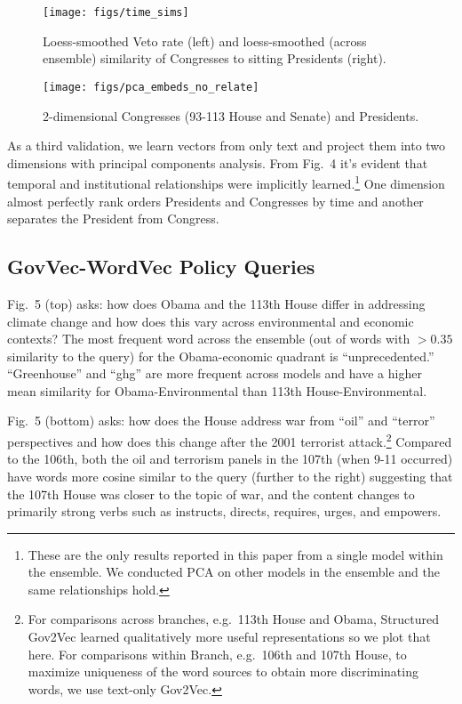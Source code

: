 \documentclass[11pt,letterpaper]{article}
\begin{document}
\begin{figure}[t]

\begin{minipage}{.48\linewidth}
  \texttt{[image: figs/time\_sims]}
  \caption{Loess-smoothed Veto rate (left) and loess-smoothed (across ensemble) similarity of Congresses to sitting Presidents (right).}
  \label{img1}
\end{minipage}
\begin{minipage}{.51\linewidth}
  \texttt{[image: figs/pca\_embeds\_no\_relate]}
  \caption{2-dimensional Congresses (93-113 House and Senate) and Presidents.}
  \label{img2}
\end{minipage}

\end{figure}

As a third validation, we learn vectors from only text and project them into two dimensions with principal components analysis. From Fig.~4 it's evident that temporal and institutional relationships were implicitly learned.\footnote{These are the only results reported in this paper from a single model within the ensemble. We conducted PCA on other models in the ensemble and the same relationships hold.} One dimension almost perfectly rank orders Presidents and Congresses by time and another separates the President from Congress.

\subsection{GovVec-WordVec Policy Queries}\label{complex-govvec-wordvec-queries}

Fig.~5 (top) asks: how does Obama and the 113th House differ in addressing climate change and how does this vary across environmental and economic contexts? The most frequent word across the ensemble (out of words with $>0.35$ similarity to the query) for the Obama-economic quadrant is ``unprecedented.'' ``Greenhouse'' and ``ghg'' are more frequent across models and have a higher mean similarity for Obama-Environmental than 113th House-Environmental. 

Fig.~5 (bottom) asks: how does the House address war from ``oil'' and ``terror'' perspectives and how does this change after the 2001 terrorist attack.\footnote{For comparisons across branches, e.g.~113th House and Obama, Structured Gov2Vec learned qualitatively more useful representations so we plot that here. For comparisons within Branch, e.g.~106th and 107th House, to maximize uniqueness of the word sources to obtain more discriminating words, we use text-only Gov2Vec.} Compared to the 106th, both the oil and terrorism panels in the 107th (when 9-11 occurred) have words more cosine similar to the query (further to the right) suggesting that the 107th House was closer to the topic of war, and the content changes to primarily strong verbs such as instructs, directs, requires, urges, and empowers.
\end{document}
